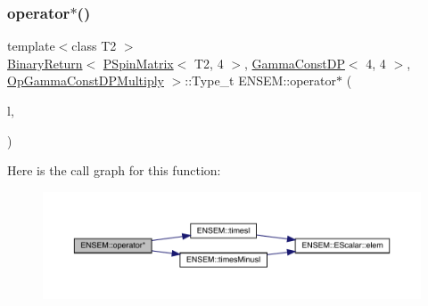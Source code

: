\subsubsection{\texorpdfstring{operator$\ast$()}{operator*()}\hspace{0.1cm}{\footnotesize\ttfamily [53/64]}}
{\footnotesize\ttfamily template$<$class T2 $>$ \\
\mbox{\hyperlink{structENSEM_1_1BinaryReturn}{Binary\+Return}}$<$ \mbox{\hyperlink{classENSEM_1_1PSpinMatrix}{P\+Spin\+Matrix}}$<$ T2, 4 $>$, \mbox{\hyperlink{classENSEM_1_1GammaConstDP}{Gamma\+Const\+DP}}$<$ 4, 4 $>$, \mbox{\hyperlink{structENSEM_1_1OpGammaConstDPMultiply}{Op\+Gamma\+Const\+D\+P\+Multiply}} $>$\+::Type\+\_\+t E\+N\+S\+E\+M\+::operator$\ast$ (\begin{DoxyParamCaption}\item[{const \mbox{\hyperlink{classENSEM_1_1PSpinMatrix}{P\+Spin\+Matrix}}$<$ T2, 4 $>$ \&}]{l,  }\item[{const \mbox{\hyperlink{classENSEM_1_1GammaConstDP}{Gamma\+Const\+DP}}$<$ 4, 4 $>$ \&}]{ }\end{DoxyParamCaption})\hspace{0.3cm}{\ttfamily [inline]}}

Here is the call graph for this function\+:\nopagebreak
\begin{figure}[H]
\begin{center}
\leavevmode
\includegraphics[width=350pt]{d6/df5/group__primspinmatrix_gabdda28125d8262f0d1b4f071aaa969eb_cgraph}
\end{center}
\end{figure}
\mbox{\label{group__primspinmatrix_gaf7e4830f4ad99e0601dccbd49cb97662}} 
